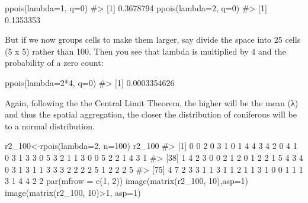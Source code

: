 \documentclass[
  letterpaper,
  DIV=11,
  numbers=noendperiod]{scrreprt}
\newenvironment{Shaded}{\begin{snugshade}}{\end{snugshade}}
\newcommand{\AttributeTok}[1]{\textcolor[rgb]{0.40,0.45,0.13}{#1}}
\newcommand{\CommentTok}[1]{\textcolor[rgb]{0.37,0.37,0.37}{#1}}
\newcommand{\DecValTok}[1]{\textcolor[rgb]{0.68,0.00,0.00}{#1}}
\newcommand{\FunctionTok}[1]{\textcolor[rgb]{0.28,0.35,0.67}{#1}}
\newcommand{\NormalTok}[1]{\textcolor[rgb]{0.00,0.23,0.31}{#1}}
\newcommand{\OtherTok}[1]{\textcolor[rgb]{0.00,0.23,0.31}{#1}}
\newcommand{\SpecialCharTok}[1]{\textcolor[rgb]{0.37,0.37,0.37}{#1}}
\begin{document}
\begin{Shaded}
\begin{Highlighting}[]
\FunctionTok{ppois}\NormalTok{(}\AttributeTok{lambda=}\DecValTok{1}\NormalTok{, }\AttributeTok{q=}\DecValTok{0}\NormalTok{)}
\CommentTok{\#\textgreater{} [1] 0.3678794}
\FunctionTok{ppois}\NormalTok{(}\AttributeTok{lambda=}\DecValTok{2}\NormalTok{, }\AttributeTok{q=}\DecValTok{0}\NormalTok{)}
\CommentTok{\#\textgreater{} [1] 0.1353353}
\end{Highlighting}
\end{Shaded}

But if we now groups cells to make them larger, say divide the space
into 25 cells (5 x 5) rather than 100. Then you see that lambda is
multiplied by 4 and the probability of a zero count:

\begin{Shaded}
\begin{Highlighting}[]
\FunctionTok{ppois}\NormalTok{(}\AttributeTok{lambda=}\DecValTok{2}\SpecialCharTok{*}\DecValTok{4}\NormalTok{, }\AttributeTok{q=}\DecValTok{0}\NormalTok{)}
\CommentTok{\#\textgreater{} [1] 0.0003354626}
\end{Highlighting}
\end{Shaded}

Again, following the the Central Limit Theorem, the higher will be the
mean (λ) and thus the spatial aggregation, the closer the distribution
of coniferous will be to a normal distribution.

\begin{Shaded}
\begin{Highlighting}[]
\NormalTok{r2\_100}\OtherTok{\textless{}{-}}\FunctionTok{rpois}\NormalTok{(}\AttributeTok{lambda=}\DecValTok{2}\NormalTok{, }\AttributeTok{n=}\DecValTok{100}\NormalTok{)}
\NormalTok{r2\_100}
\CommentTok{\#\textgreater{}   [1] 0 0 2 0 3 1 0 1 4 4 3 4 2 0 4 1 0 3 1 3 3 0 5 3 2 1 1 3 0 0 5 2 2 1 4 3 1}
\CommentTok{\#\textgreater{}  [38] 1 4 2 3 0 0 2 1 2 0 1 2 2 1 5 4 3 4 0 3 1 3 1 1 3 3 3 2 2 2 2 5 1 2 2 2 5}
\CommentTok{\#\textgreater{}  [75] 4 7 2 3 3 1 1 3 1 1 2 1 1 3 1 0 0 1 1 1 3 1 4 4 2 2}
\FunctionTok{par}\NormalTok{(}\AttributeTok{mfrow =} \FunctionTok{c}\NormalTok{(}\DecValTok{1}\NormalTok{, }\DecValTok{2}\NormalTok{))}
\FunctionTok{image}\NormalTok{(}\FunctionTok{matrix}\NormalTok{(r2\_100, }\DecValTok{10}\NormalTok{),}\AttributeTok{asp=}\DecValTok{1}\NormalTok{)}
\FunctionTok{image}\NormalTok{(}\FunctionTok{matrix}\NormalTok{(r2\_100, }\DecValTok{10}\NormalTok{)}\SpecialCharTok{\textgreater{}}\DecValTok{1}\NormalTok{, }\AttributeTok{asp=}\DecValTok{1}\NormalTok{)}
\end{Highlighting}
\end{Shaded}
\end{document}
